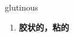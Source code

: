 
\begin{frame}
{\huge glutinous}
\begin{center}
\begin{enumerate}\Large
  \item \textbf{胶状的，粘的}
\end{enumerate}
\end{center}
\end{frame}

